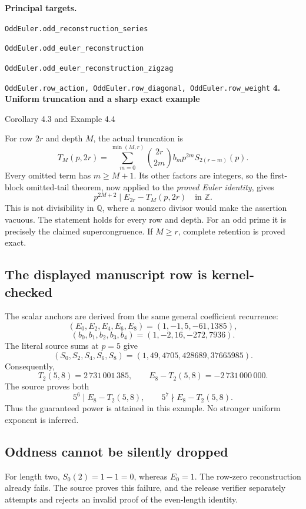 \documentclass[11pt]{article}
\newcommand{\Q}{\mathbb Q}\newcommand{\Z}{\mathbb Z}\newcommand{\N}{\mathbb N}
\newcommand{\target}[1]{{\footnotesize\texttt{#1}}}
\newcommand{\pageheading}[2]{{\Large\bfseries\color{ink}#1}\par{\small #2}\par\medskip}
\begin{document}
\textbf{Principal targets.}\par
\target{OddEuler.odd\_reconstruction\_series}\par
\target{OddEuler.odd\_euler\_reconstruction}\par
\target{OddEuler.odd\_euler\_reconstruction\_zigzag}\par
\target{OddEuler.row\_action, OddEuler.row\_diagonal, OddEuler.row\_weight}
\newpage
\pageheading{4. Uniform truncation and a sharp exact example}{Corollary 4.3 and Example 4.4}
For row $2r$ and depth $M$, the actual truncation is
\[
 T_M(p,2r)=\sum_{m=0}^{\min(M,r)}\binom{2r}{2m}b_m p^{2m}S_{2(r-m)}(p).
\]
Every omitted term has $m\ge M+1$. Its other factors are integers, so the first-block omitted-tail theorem, now applied to the \emph{proved Euler identity}, gives
\[
 \boxed{p^{2M+2}\mid E_{2r}-T_M(p,2r)\quad\text{in }\Z.}
\]
This is not divisibility in $\Q$, where a nonzero divisor would make the assertion vacuous. The statement holds for every row and depth. For an odd prime it is precisely the claimed supercongruence. If $M\ge r$, complete retention is proved exact.

\subsection*{The displayed manuscript row is kernel-checked}
The scalar anchors are derived from the same general coefficient recurrence:
\[
 (E_0,E_2,E_4,E_6,E_8)=(1,-1,5,-61,1385),
\]
\[
 (b_0,b_1,b_2,b_3,b_4)=(1,-2,16,-272,7936).
\]
The literal source sums at $p=5$ give
\[
 (S_0,S_2,S_4,S_6,S_8)=(1,49,4705,428689,37665985).
\]
Consequently,
\[
 T_2(5,8)=2\,731\,001\,385,\qquad
 E_8-T_2(5,8)=-2\,731\,000\,000.
\]
The source proves both
\[
 5^6\mid E_8-T_2(5,8),\qquad 5^7\nmid E_8-T_2(5,8).
\]
Thus the guaranteed power is attained in this example. No stronger uniform exponent is inferred.

\subsection*{Oddness cannot be silently dropped}
For length two, $S_0(2)=1-1=0$, whereas $E_0=1$. The row-zero reconstruction already fails. The source proves this failure, and the release verifier separately attempts and rejects an invalid proof of the even-length identity.
\end{document}
